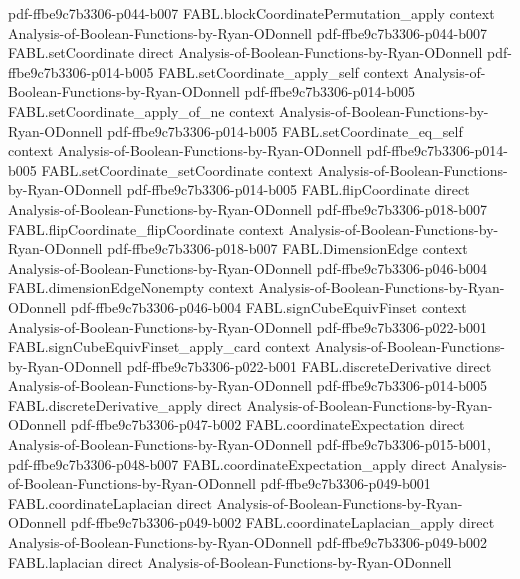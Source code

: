 \begin{theorem}
  {pdf-ffbe9c7b3306-p044-b007}
\proofstep
  {FABL.blockCoordinatePermutation_apply}
  {context}
  {Analysis-of-Boolean-Functions-by-Ryan-ODonnell}
  {pdf-ffbe9c7b3306-p044-b007}
\proofstep
  {FABL.setCoordinate}
  {direct}
  {Analysis-of-Boolean-Functions-by-Ryan-ODonnell}
  {pdf-ffbe9c7b3306-p014-b005}
\proofstep
  {FABL.setCoordinate_apply_self}
  {context}
  {Analysis-of-Boolean-Functions-by-Ryan-ODonnell}
  {pdf-ffbe9c7b3306-p014-b005}
\proofstep
  {FABL.setCoordinate_apply_of_ne}
  {context}
  {Analysis-of-Boolean-Functions-by-Ryan-ODonnell}
  {pdf-ffbe9c7b3306-p014-b005}
\proofstep
  {FABL.setCoordinate_eq_self}
  {context}
  {Analysis-of-Boolean-Functions-by-Ryan-ODonnell}
  {pdf-ffbe9c7b3306-p014-b005}
\proofstep
  {FABL.setCoordinate_setCoordinate}
  {context}
  {Analysis-of-Boolean-Functions-by-Ryan-ODonnell}
  {pdf-ffbe9c7b3306-p014-b005}
\proofstep
  {FABL.flipCoordinate}
  {direct}
  {Analysis-of-Boolean-Functions-by-Ryan-ODonnell}
  {pdf-ffbe9c7b3306-p018-b007}
\proofstep
  {FABL.flipCoordinate_flipCoordinate}
  {context}
  {Analysis-of-Boolean-Functions-by-Ryan-ODonnell}
  {pdf-ffbe9c7b3306-p018-b007}
\proofstep
  {FABL.DimensionEdge}
  {context}
  {Analysis-of-Boolean-Functions-by-Ryan-ODonnell}
  {pdf-ffbe9c7b3306-p046-b004}
\proofstep
  {FABL.dimensionEdgeNonempty}
  {context}
  {Analysis-of-Boolean-Functions-by-Ryan-ODonnell}
  {pdf-ffbe9c7b3306-p046-b004}
\proofstep
  {FABL.signCubeEquivFinset}
  {context}
  {Analysis-of-Boolean-Functions-by-Ryan-ODonnell}
  {pdf-ffbe9c7b3306-p022-b001}
\proofstep
  {FABL.signCubeEquivFinset_apply_card}
  {context}
  {Analysis-of-Boolean-Functions-by-Ryan-ODonnell}
  {pdf-ffbe9c7b3306-p022-b001}
\proofstep
  {FABL.discreteDerivative}
  {direct}
  {Analysis-of-Boolean-Functions-by-Ryan-ODonnell}
  {pdf-ffbe9c7b3306-p014-b005}
\proofstep
  {FABL.discreteDerivative_apply}
  {direct}
  {Analysis-of-Boolean-Functions-by-Ryan-ODonnell}
  {pdf-ffbe9c7b3306-p047-b002}
\proofstep
  {FABL.coordinateExpectation}
  {direct}
  {Analysis-of-Boolean-Functions-by-Ryan-ODonnell}
  {pdf-ffbe9c7b3306-p015-b001,
    pdf-ffbe9c7b3306-p048-b007}
\proofstep
  {FABL.coordinateExpectation_apply}
  {direct}
  {Analysis-of-Boolean-Functions-by-Ryan-ODonnell}
  {pdf-ffbe9c7b3306-p049-b001}
\proofstep
  {FABL.coordinateLaplacian}
  {direct}
  {Analysis-of-Boolean-Functions-by-Ryan-ODonnell}
  {pdf-ffbe9c7b3306-p049-b002}
\proofstep
  {FABL.coordinateLaplacian_apply}
  {direct}
  {Analysis-of-Boolean-Functions-by-Ryan-ODonnell}
  {pdf-ffbe9c7b3306-p049-b002}
\proofstep
  {FABL.laplacian}
  {direct}
  {Analysis-of-Boolean-Functions-by-Ryan-ODonnell}

\end{theorem}
